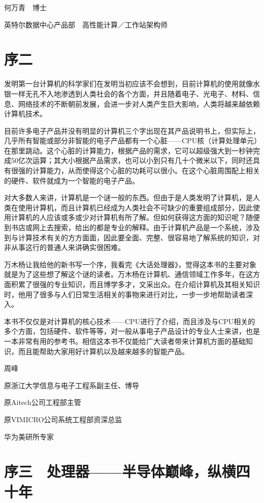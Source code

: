 \documentclass[12pt,UTF8]{ctexbook}
\begin{document}
何万青　博士

英特尔数据中心产品部　高性能计算／工作站架构师

\chapter{序二}

发明第一台计算机的科学家们在发明当初应该不会想到，目前计算机的使用就像水银一样无孔不入地渗透到人类社会的各个方面，并且随着电子、光电子、材料、信息、网络技术的不断朝前发展，会进一步对人类产生巨大影响，人类将越来越依赖计算机技术。

目前许多电子产品并没有明显的计算机三个字出现在其产品说明书上，但实际上，几乎所有智能或部分非智能的电子产品都有一个心脏——CPU核（计算处理单元）在那里跳动。这个心脏的计算能力，根据产品的需求，它可以超级强大到一秒钟完成50亿次运算；其大小根据产品需求，也可以小到只有几十个微米以下，同时还具有很强的计算能力，从而使得这个心脏的功耗可以很小。在这个心脏周围配上相关的硬件、软件就成为一个智能的电子产品。

对大多数人来讲，计算机是一个谜一般的东西。但由于是人类发明了计算机，是人类在使用计算机，而且计算机已经成为人类社会不可缺少的重要组成部分，因此使用计算机的人应该或多或少对计算机有所了解。但如何获得这方面的知识呢？随便到书店或网上去搜索，给出的都是专业的解释。由于计算机产品是一个系统，涉及到与计算技术有关的方方面面，因此要全面、完整、很容易地了解系统的知识，对非从事这行的普通人来讲确实很困难。

万木杨让我给他的新书写一个序，我看完《大话处理器》，觉得这本书的主要对象就是为了这些想了解这个谜的读者。万木杨在计算机、通信领域工作多年，在这方面积累了很强的专业知识，而且博学多才，文采出众。在介绍计算机及其相关知识时，他用了很多与人们日常生活相关的事物来进行对比，一步一步地帮助读者深入。

本书不仅仅是对计算机的核心技术——CPU进行了介绍，而且涉及与CPU相关的多个方面，包括硬件、软件等等，对一般从事电子产品设计的专业人士来讲，也是一本非常有用的参考书。相信这本书不仅能给广大读者带来计算机方面的基础知识，而且能帮助大家用好计算机以及越来越多的智能产品。

周峰

原浙江大学信息与电子工程系副主任、博导

原Aitech公司工程部主管

原VIMICRO公司系统工程部资深总监

华为美研所专家

\chapter{序三　处理器——半导体巅峰，纵横四十年}
\end{document}
